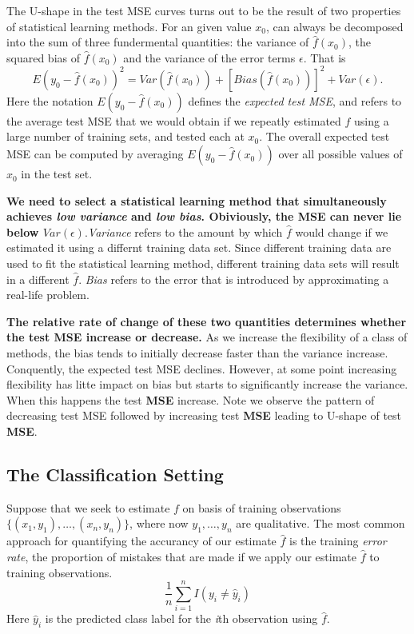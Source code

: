\documentclass{article}
\begin{document}
The U-shape in the test MSE curves turns out to be the result of two properties of statistical learning methods. For an given value $x_0$, can always be decomposed into the sum of three fundermental quantities: the variance of $\hat{f}(x_0)$, the squared bias of $\hat{f}(x_0)$ and the variance of the error terms $\epsilon$. That is
\begin{equation}
E(y_0-\hat{f}(x_0))^2 = Var(\hat{f}(x_0)) + [Bias(\hat{f}(x_0))]^2 + Var(\epsilon).
\end{equation}
Here the notation $E(y_0-\hat{f}(x_0))$ defines the \textit{expected test MSE}, and refers to the average test MSE that we would obtain if we repeatly estimated $f$ using a large number of training sets, and tested each at $x_0$. The overall expected test MSE can be computed by averaging $E(y_0-\hat{f}(x_0))$ over all possible values of $x_0$ in the test set.

\textbf{We need to select a statistical learning method that simultaneously achieves \textit{low variance} and \textit{low bias}. Obiviously, the MSE can never lie below $Var(\epsilon)$}.\textit{Variance} refers to the amount by which $\hat{f}$ would change if we estimated it  using a differnt training data set. Since different training data are used to fit the statistical learning method, different training data sets will result in a different $\hat{f}$. \textit{Bias} refers to the error that is introduced by approximating a real-life problem.

\textbf{The relative rate of change of these two quantities determines whether the test MSE increase or decrease.} As we increase the flexibility of a class of methods, the bias tends to initially decrease faster than the variance increase. Conquently, the expected test MSE declines. However, at some point increasing flexibility has litte impact on bias but starts to significantly increase the variance. When this happens the test \textbf{MSE} increase. Note we observe the pattern of decreasing test MSE followed by increasing test \textbf{MSE} leading to U-shape of test \textbf{MSE}.	
\subsection{The Classification Setting}

Suppose that we seek to estimate $f$ on basis of training observations $\lbrace(x_1,y_1), \dots, (x_n,y_n)\rbrace$, where now $y_1, \dots, y_n$ are qualitative. The most common approach for quantifying the accurancy of our estimate $\hat{f}$ is the training \textit{error rate}, the proportion of mistakes that are made if we apply our estimate $\hat{f}$ to training observations.
\begin{equation}
\frac{1}{n}\sum_{i=1}^nI(y_i\neq \hat{y}_i)
\end{equation}
Here $\hat{y}_i$ is the predicted class label for the \textit{i}th observation using $\hat{f}$.
\end{document}
